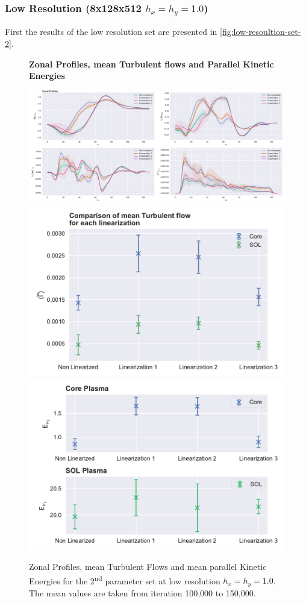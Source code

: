\documentclass[master.tex]{subfiles}
\begin{document}
\subsubsection{Low Resolution (8x128x512 $h_x=h_y=1.0$)}

First the results of the low resolution set are presented in \autoref{fig:low-resoultion-set-2}.

\begin{figure}[!hbtp]
    \textbf{Zonal Profiles, mean Turbulent flows and Parallel Kinetic Energies}\par\medskip
    \includegraphics[width=\linewidth]{pdfs/0-2_0-96/zonal_profiles_100000.pdf}
    \includegraphics[width=0.5\linewidth]{pdfs/0-2_0-96/turbulent_flow_means_100000.pdf}
    \includegraphics[width=0.5\linewidth]{pdfs/0-2_0-96/parallelvelocity_mean_100000.pdf}
    \caption{Zonal Profiles, mean Turbulent Flows and mean parallel Kinetic Energies for the 2\textsuperscript{nd} parameter set at low resolution $h_x = h_y = 1.0$. The mean values are taken from iteration 100,000 to 150,000.}
    \label{fig:low-resoultion-set-2}
\end{figure}
\end{document}

